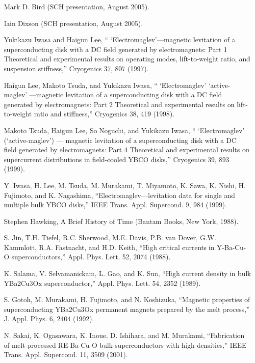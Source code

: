 \noindent [9.3] Mark D. Bird (SCH presentation, August 2005).

\noindent [9.4] Iain Dixson (SCH presentation, August 2005).

\noindent [9.5] Yukikazu Iwasa and Haigun Lee, `` ‘Electromaglev’—magnetic levitation of a superconducting
disk with a DC field generated by electromagnets: Part 1 Theoretical
and experimental results on operating modes, lift-to-weight ratio, and suspension
stiffness,” Cryogenics 37, 807 (1997).

\noindent [9.6] Haigun Lee, Makoto Tsuda, and Yukikazu Iwasa, `` ‘Electromaglev’ ‘active-maglev’ —magnetic levitation of a superconducting disk with a DC field generated by electromagnets: Part 2 Theoretical and experimental results on lift-to-weight ratio and stiffness,” Cryogenics 38, 419 (1998).

\noindent [9.7] Makoto Tsuda, Haigun Lee, So Noguchi, and Yukikazu Iwasa, `` ‘Electromaglev’
(‘active-maglev’) — magnetic levitation of a superconducting disk with a DC field
generated by electromagnets: Part 4 Theoretical and experimental results on supercurrent
distributions in field-cooled YBCO disks,” Cryogenics 39, 893 (1999).

\noindent [9.8] Y. Iwasa, H. Lee, M. Tsuda, M. Murakami, T. Miyamoto, K. Sawa, K. Nishi,
H. Fujimoto, and K. Nagashima, ``Electromaglev—levitation data for single and
multiple bulk YBCO disks,” IEEE Trans. Appl. Supercond. 9, 984 (1999).

\noindent [9.9] Stephen Hawking, A Brief History of Time (Bantam Books, New York, 1988).

\noindent [9.10] S. Jin, T.H. Tiefel, R.C. Sherwood, M.E. Davis, P.B. van Dover, G.W. Kammlott,
R.A. Fastnacht, and H.D. Keith, ``High critical currents in Y-Ba-Cu-O superconductors,”
Appl. Phys. Lett. 52, 2074 (1988).

\noindent [9.11] K. Salama, V. Selvamanickam, L. Gao, and K. Sun, ``High current density in bulk
YBa2Cu3Ox superconductor,” Appl. Phys. Lett. 54, 2352 (1989).

\noindent [9.12] S. Gotoh, M. Murakami, H. Fujimoto, and N. Koshizuka, ``Magnetic properties of superconducting YBa2Cu3Ox permanent magnets prepared by the melt process,” J. Appl. Phys. 6, 2404 (1992).

\noindent [9.13] N. Sakai, K. Ogasawara, K. Inoue, D. Ishihara, and M. Murakami, ``Fabrication of melt-processed RE-Ba-Cu-O bulk superconductors with high densities,” IEEE Trans. Appl. Supercond. 11, 3509 (2001).


